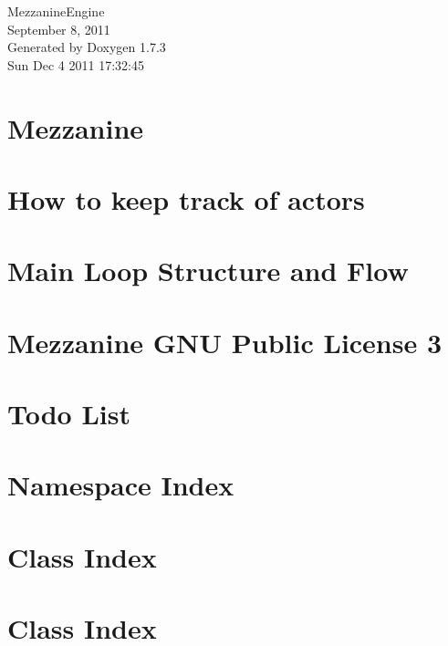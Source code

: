\documentclass[a4paper]{article}
\begin{document}
\hypersetup{pageanchor=false}
\begin{titlepage}
\vspace*{7cm}
\begin{center}
{\Large MezzanineEngine \\[1ex]\large September 8, 2011 }\\
\vspace*{1cm}
{\large Generated by Doxygen 1.7.3}\\
\vspace*{0.5cm}
{\small Sun Dec 4 2011 17:32:45}\\
\end{center}
\end{titlepage}
\tableofcontents
{}
\hypersetup{pageanchor=true}
\section{Mezzanine}
\label{index}\hypertarget{index}{}
\section{How to keep track of actors}
\label{actorcontainer1}
\hypertarget{actorcontainer1}{}

\section{Main Loop Structure and Flow}
\label{mainloop1}
\hypertarget{mainloop1}{}

\section{Mezzanine GNU Public License 3}
\label{GPLLicense}
\hypertarget{GPLLicense}{}

\section{Todo List}
\label{todo}
\hypertarget{todo}{}

\section{Namespace Index}

\section{Class Index}

\section{Class Index}

\end{document}

